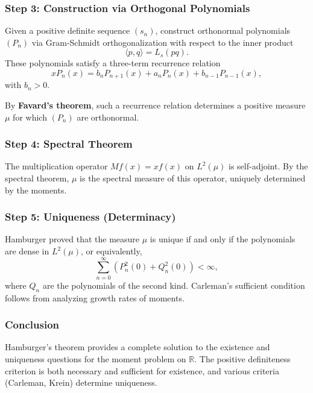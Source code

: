 \documentclass{article}
\begin{document}
\subsubsection*{Step 3: Construction via Orthogonal Polynomials}

Given a positive definite sequence $(s_n)$, construct orthonormal polynomials $(P_n)$ via Gram-Schmidt orthogonalization with respect to the inner product
\[
\langle p, q \rangle = L_s(pq).
\]
These polynomials satisfy a three-term recurrence relation
\[
x P_n(x) = b_n P_{n+1}(x) + a_n P_n(x) + b_{n-1} P_{n-1}(x),
\]
with $b_n > 0$.

By \textbf{Favard's theorem}, such a recurrence relation determines a positive measure $\mu$ for which $(P_n)$ are orthonormal.

\subsubsection*{Step 4: Spectral Theorem}

The multiplication operator $Mf(x) = xf(x)$ on $L^2(\mu)$ is self-adjoint. By the spectral theorem, $\mu$ is the spectral measure of this operator, uniquely determined by the moments.

\subsubsection*{Step 5: Uniqueness (Determinacy)}

Hamburger proved that the measure $\mu$ is unique if and only if the polynomials are dense in $L^2(\mu)$, or equivalently,
\[
\sum_{n=0}^{\infty} \left(P_n^2(0) + Q_n^2(0)\right) < \infty,
\]
where $Q_n$ are the polynomials of the second kind. Carleman's sufficient condition follows from analyzing growth rates of moments.

\subsubsection*{Conclusion}

Hamburger's theorem provides a complete solution to the existence and uniqueness questions for the moment problem on $\mathbb{R}$. The positive definiteness criterion is both necessary and sufficient for existence, and various criteria (Carleman, Krein) determine uniqueness.
\end{document}
